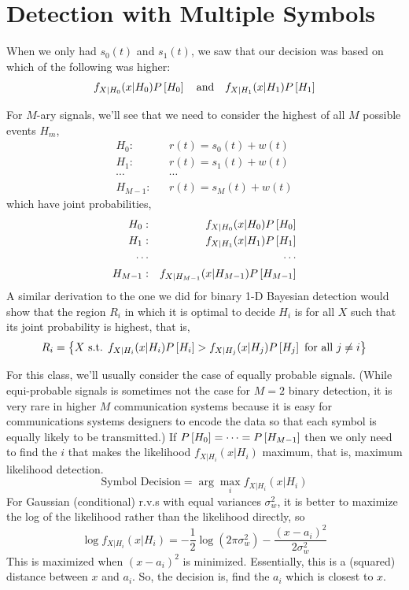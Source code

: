 \section{Detection with Multiple Symbols}

When we only had $s_0(t)$ and $s_1(t)$, we saw that our decision was
based on which of the following was higher:
\[
  f_{X|H_0}(x| H_0) P\left[{H_0}\right] \quad \mbox{and} \quad f_{X|H_1}(x| H_1) P\left[{H_1}\right]
\]

For $M$-ary signals, we'll see that we need to consider the highest
of all $M$ possible events $H_m$,
\begin{eqnarray}
  H_0: && r(t) = s_0(t) + w(t) \nonumber \\
  H_1: && r(t) = s_1(t) + w(t) \nonumber \\
  \cdots && \cdots \nonumber \\
  H_{M-1}: && r(t) = s_M(t) + w(t) \nonumber
\end{eqnarray}
which have joint probabilities,
\begin{eqnarray}
  H_0: && f_{X|H_0}(x| H_0) P\left[{H_0}\right] \nonumber \\
  H_1: && f_{X|H_1}(x| H_1) P\left[{H_1}\right] \nonumber \\
  \cdots && \cdots \nonumber \\
  H_{M-1}: && f_{X|H_{M-1}}(x| H_{M-1}) P\left[{H_{M-1}}\right] \nonumber
\end{eqnarray}
A similar derivation to the one we did for binary 1-D Bayesian detection would show that the region $R_i$ in which it is optimal to decide $H_i$ is for all $X$ such that its joint probability is highest, that is,
\[
R_i = \left\{ X \mbox{ s.t. } f_{X|H_i}(x| H_i) P\left[{H_i}\right] > f_{X|H_j}(x| H_j) P\left[{H_j}\right] \mbox{ for all } j\neq i \right\}
\]

For this class, we'll usually consider the case of equally probable signals.  (While equi-probable signals is sometimes not the case for
$M=2$ binary detection, it is very rare in higher $M$ communication
systems because it is easy for communications systems designers to encode the data so that each symbol is equally likely to be transmitted.)  If $P\left[{H_0}\right] = \cdots = P\left[{H_{M-1}}\right]$ then we only need to find the $i$ that makes the likelihood $f_{X|H_i}(x| H_i)$ maximum, that is, maximum likelihood detection.
\[
  \mbox{Symbol Decision} = \arg \max_i f_{X|H_i}(x| H_i)
\]
For Gaussian (conditional) r.v.s with equal variances $\sigma_w^2$,
it is better to maximize the log of the likelihood rather than the likelihood directly, so
\[
  \log f_{X|H_i}(x| H_i) =  -\frac{1}{2}\log (2\pi \sigma_w^2)  - \frac{(x-a_i)^2}{2\sigma_w^2}
\]
This is maximized when $(x-a_i)^2$ is minimized.  Essentially, this
is a (squared) distance between $x$ and $a_i$.  So, the decision is,
find the $a_i$ which is closest to $x$.

